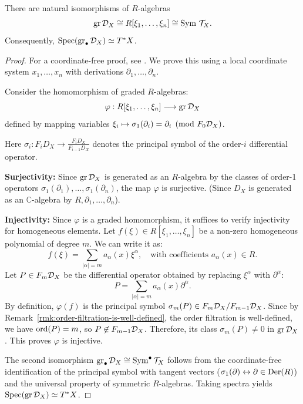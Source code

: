 \begin{lemma}\label{lem:grDx}
    There are natural isomorphisms of $R$-algebras
    \[
        \operatorname{gr} \mathcal{D}_X \cong R[\xi_1,\dots,\xi_n] \cong \operatorname{Sym}\,\mathcal{T}_X.
    \]
    Consequently, $\operatorname{Spec}(\operatorname{gr}_\bullet \mathcal{D}_X)\simeq T^{\ast}X$.
\end{lemma}
\begin{proof}
    For a coordinate-free proof, see \cite[Theorem 5.2 (PBW for $\D_X$)]{chen2024dmodules}. We prove this using a local coordinate system $x_1, \dots, x_n$ with derivations $\partial_1, \dots, \partial_n$.

    Consider the homomorphism of graded $R$-algebras:
    \[
        \varphi: R[\xi_1, \dots, \xi_n] \longrightarrow \operatorname{gr} \mathcal{D}_X
    \]
    defined by mapping variables $\xi_i \mapsto \sigma_1(\partial_i) = \partial_i \pmod{F_0 \mathcal{D}_X}$.

    Here $\sigma_i: F_i D_X \longrightarrow \frac{F_i D_X}{F_{i-1} D_X}$ denotes the principal symbol of the order-$i$ differential operator.

    \textbf{Surjectivity:} Since $\operatorname{gr} \mathcal{D}_X$ is generated as an $R$-algebra by the classes of order-1 operators $\sigma_1(\partial_1), \dots, \sigma_1(\partial_n)$, the map $\varphi$ is surjective.
    (Since $D_X$ is generated as an $\mathbb{C}$-algebra by $R, \partial_1, \dots, \partial_n$).

    \textbf{Injectivity:} Since $\varphi$ is a graded homomorphism, it suffices to verify injectivity for homogeneous elements.
    Let $f(\xi) \in R[\xi_1, \dots, \xi_n]$ be a non-zero homogeneous polynomial of degree $m$. We can write it as:
    \[
        f(\xi) = \sum_{|\alpha|=m} a_\alpha(x) \xi^\alpha, \quad \text{with coefficients } a_\alpha(x) \in R.
    \]
    Let $P \in F_m \mathcal{D}_X$ be the differential operator obtained by replacing $\xi^\alpha$ with $\partial^\alpha$:
    \[
        P = \sum_{|\alpha|=m} a_\alpha(x) \partial^\alpha.
    \]
    By definition, $\varphi(f)$ is the principal symbol $\sigma_m(P) \in F_m \mathcal{D}_X / F_{m-1} \mathcal{D}_X$.
    Since by Remark~\ref{rmk:order-filtration-is-well-defined}, the order filtration is well-defined, we have $\operatorname{ord}(P) = m$, so $P\not\in F_{m-1} \mathcal{D}_X$.
    Therefore, its class $\sigma_m(P) \neq 0$ in $\operatorname{gr} \mathcal{D}_X$. This proves $\varphi$ is injective.

    The second isomorphism $\operatorname{gr}_\bullet \mathcal{D}_X \cong \operatorname{Sym}^{\bullet} \mathcal{T}_X$ follows from the coordinate-free identification of the principal symbol with tangent vectors ($\sigma_1(\partial) \leftrightarrow \partial \in \operatorname{Der}(R)$) and the universal property of symmetric $R$-algebras. Taking spectra yields $\operatorname{Spec}(\operatorname{gr} \mathcal{D}_X) \simeq T^* X$.
\end{proof}

